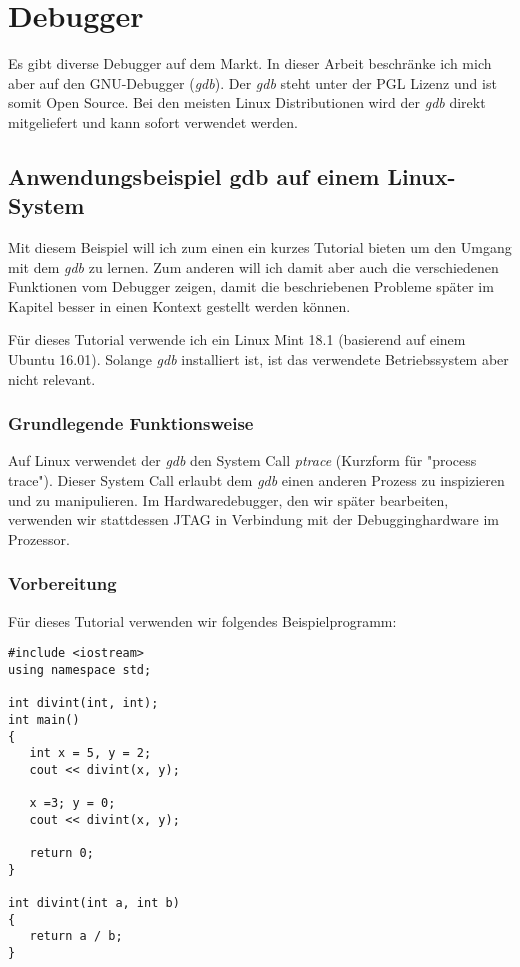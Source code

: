 \chapter{Debugger}

Es gibt diverse Debugger auf dem Markt.
In dieser Arbeit beschränke ich mich aber auf den GNU-Debugger (\textit{gdb}).
Der \textit{gdb} steht unter der PGL Lizenz und ist somit Open Source.
Bei den meisten Linux Distributionen wird der \textit{gdb} direkt mitgeliefert und kann sofort verwendet werden.


\section{Anwendungsbeispiel gdb auf einem Linux-System}
Mit diesem Beispiel will ich zum einen ein kurzes Tutorial bieten um den Umgang mit dem \textit{gdb} zu lernen.
Zum anderen will ich damit aber auch die verschiedenen Funktionen vom Debugger zeigen, damit die beschriebenen Probleme später im Kapitel besser in einen Kontext gestellt werden können.

Für dieses Tutorial verwende ich ein Linux Mint 18.1 (basierend auf einem Ubuntu 16.01).
Solange \textit{gdb} installiert ist, ist das verwendete Betriebssystem aber nicht relevant.

\subsection{Grundlegende Funktionsweise}
Auf Linux verwendet der \textit{gdb} den System Call \textit{ptrace} (Kurzform für "process trace").
Dieser System Call erlaubt dem \textit{gdb} einen anderen Prozess zu inspizieren und zu manipulieren.
Im Hardwaredebugger, den wir später bearbeiten, verwenden wir stattdessen JTAG in Verbindung mit der Debugginghardware im Prozessor.

\subsection{Vorbereitung}
Für dieses Tutorial verwenden wir folgendes Beispielprogramm:

\lstset{language=c}
\begin{lstlisting}
#include <iostream>
using namespace std;  

int divint(int, int);  
int main() 
{ 
   int x = 5, y = 2; 
   cout << divint(x, y); 
   
   x =3; y = 0; 
   cout << divint(x, y); 
   
   return 0; 
}  

int divint(int a, int b) 
{ 
   return a / b; 
}  

\end{lstlisting}

